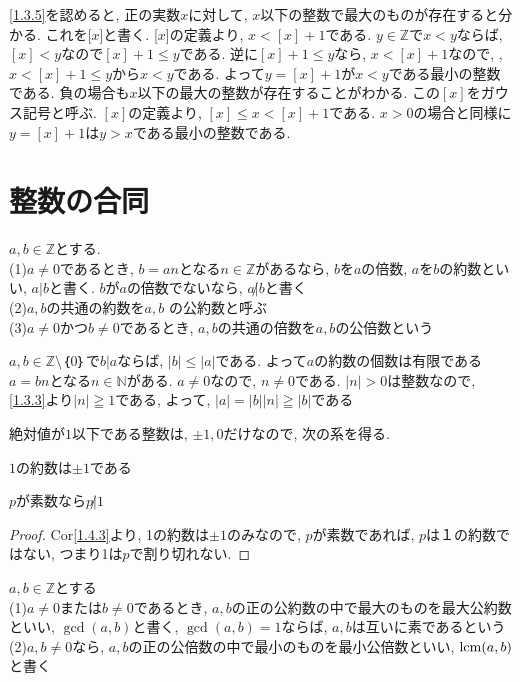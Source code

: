 \cref{1.3.5}を認めると, 正の実数$x$に対して, $x$以下の整数で最大のものが存在すると分かる. これを[$x$]と書く. [$x$]の定義より, $x<[x]+1$である. $y\in\mathbb{Z}$で$x<y$ならば, $[x]<y$なので$[x]+1\leq y$である. 
逆に$[x]+1\leq y$なら, $x<[x]+1$なので, , $x<[x]+1\leq yからx<y$である. よって$y=[x]+1$が$x<y$である最小の整数である. 負の場合も$x$以下の最大の整数が存在することがわかる. この$[x]$をガウス記号と呼ぶ. 
$[x]$の定義より, $[x]\leq x<[x]+1$である. $x>0$の場合と同様に$y=[x]+1$は$y>x$である最小の整数である. 


\section{整数の合同}

\begin{dfn}\label{1.4.1}
$a, b\in\mathbb{Z}$とする. 
\\(1)$a\ne0$であるとき, $b=an$となる$n\in\mathbb{Z}$があるなら, $b$を$a$の倍数, $a$を$b$の約数といい, $a|b$と書く. $b$が$a$の倍数でないなら, $a\not|b$と書く
\\(2)$a, b$の共通の約数を$a, b$ の公約数と呼ぶ
\\(3)$a\ne0$かつ$b\ne0$であるとき, $a, b$の共通の倍数を$a, b$の公倍数という
\end{dfn}

\begin{prop}\label{1.4.2}
$a, b\in\mathbb{Z}\setminus {｛0｝}$で$b|a$ならば, $|b|\leq|a|$である. よって$a$の約数の個数は有限である
$a=bn$となる$n\in\mathbb{N}$がある. $a\ne0$なので, $n\ne0$である. $|n|>0$は整数なので, \cref{1.3.3}より$|n|\geqq1$である, よって, $|a|=|b||n|\geqq|b|$である
\end{prop}


絶対値が$1$以下である整数は, $\pm1, 0$だけなので, 次の系を得る. 

\begin{cor}\label{1.4.3}
\quad $1$の約数は$\pm1$である
\end{cor}

\begin{cor}\label{1.4.4}
\quad $p$が素数なら$p\not|1$
\end{cor}
\begin{proof}
Cor\cref{1.4.3}より, 1の約数は$\pm1$のみなので, $p$が素数であれば, $p$は１の約数ではない, つまり1は$p$で割り切れない. 
\end{proof}

\begin{dfn}\label{1.4.5}
$a, b\in\mathbb{Z}$とする
\\(1)$a\ne0$または$b\ne0$であるとき, $a, b$の正の公約数の中で最大のものを最大公約数といい, $\gcd(a, b)$と書く, $\gcd(a, b)=1$ならば, $a, b$は互いに素であるという
\\(2)$a, b\ne0$なら, $a, b$の正の公倍数の中で最小のものを最小公倍数といい, $\operatorname{lcm}(a, b)$と書く
\end{dfn}


